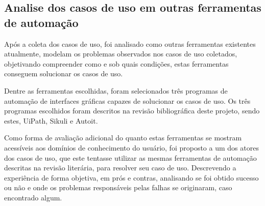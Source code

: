 \documentclass[tg]{mdtufsm}
\begin{document}
        	\subsection {Analise dos casos de uso em outras ferramentas de automação}

            	Após a coleta dos casos de uso, foi analisado como outras ferramentas existentes atualmente, modelam os problemas observados nos casos de uso coletados, objetivando compreender como e sob quais condições, estas ferramentas conseguem solucionar os casos de uso.

                Dentre as ferramentas escolhidas, foram selecionados três programas de automação de interfaces gráficas capazes de solucionar os casos de uso. Os três programas escolhidos foram descritos na revisão bibliográfica deste projeto, sendo estes, UiPath, Sikuli e Autoit.

            	Como forma de avaliação adicional do quanto estas ferramentas se mostram acessíveis aos domínios de conhecimento do usuário, foi proposto a um dos atores dos casos de uso, que este tentasse utilizar as mesmas ferramentas de automação descritas na revisão literária, para resolver seu caso de uso. Descrevendo a experiência de forma objetiva, em prós e contras, analisando se foi obtido sucesso ou não e onde os problemas responsáveis pelas falhas se originaram, caso encontrado algum.
            	\bigskip
\end{document}

